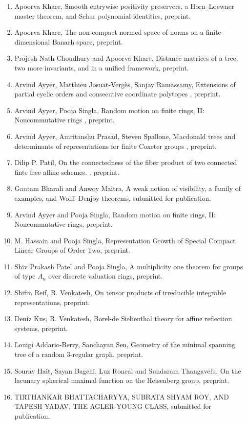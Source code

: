 \begin{enumerate}
\item Apoorva Khare, Smooth entrywise positivity preservers, a Horn–Loewner master theorem, and Schur polynomial identities, preprint.
\item Apoorva Khare, The non-compact normed space of norms on a finite-dimensional Banach space, preprint.
\item Projesh Nath Choudhury and Apoorva Khare, Distance matrices of a tree: two more invariants, and in a unified framework, preprint.
\item Arvind Ayyer, Matthieu Josuat-Vergès, Sanjay Ramassamy, Extensions of partial cyclic orders and consecutive coordinate polytopes , preprint.
\item Arvind Ayyer, Pooja Singla, Random motion on finite rings, II: Noncommutative rings , preprint.
\item Arvind Ayyer, Amritanshu Prasad, Steven Spallone, Macdonald trees and determinants of representations for finite Coxeter groups , preprint.
\item Dilip P. Patil, On the connectedness of the fiber product of two connected finte free affine schemes. , preprint.
\item Gautam Bharali and Anwoy Maitra, A weak notion of visibility, a family of examples, and Wolff--Denjoy theorems, submitted for publication.
\item Arvind Ayyer and Pooja Singla, Random motion on finite rings, II: Noncommutative rings, preprint.
\item M. Hassain and Pooja Singla, Representation Growth of Special Compact Linear Groups of Order Two, preprint.
\item Shiv Prakash Patel and Pooja Singla, A multiplicity one theorem for groups of type $A_n$ over discrete valuation rings, preprint.
\item Shifra Reif, R. Venkatesh, On tensor products of irreducible integrable representations, preprint.
\item Deniz Kus, R. Venkatesh, Borel-de Siebenthal theory for affine reflection systems, preprint.
\item Louigi Addario-Berry, Sanchayan Sen, Geometry of the minimal spanning tree of a random 3-regular graph, preprint.
\item Sourav Hait, Sayan Bagchi, Luz Roncal and Sundaram Thangavelu, On the lacunary spherical maximal function on the Heisenberg group, preprint.
\item TIRTHANKAR BHATTACHARYYA, SUBRATA SHYAM ROY, AND TAPESH YADAV, THE AGLER-YOUNG CLASS, submitted for publication.

\end{enumerate}
